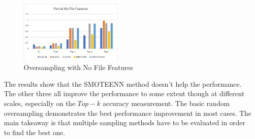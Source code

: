 \begin{figure}[!ht]
\begin{center}
\includegraphics[width=0.45\textwidth]{./figure/partial-nofile-oversampling}
\end{center}
\caption{Oversampling with No File Features}
\label{fig:dt}
\end{figure}

The results show that the SMOTEENN method doesn't help the performance. The other three all improve the performance to some extent though at different scales, especially on the $Top-k$ accuracy measurement. The basic random oversampling demonstrates the best performance improvement in most cases.  The main takeaway is that multiple sampling methods have to be evaluated in order to find the best one.
